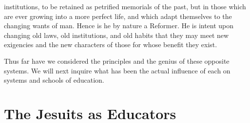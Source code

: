 \documentclass[]{book}
\begin{document}
institutions, to be retained as petrified memorials of the past, but in those which are ever growing into a more perfect life, and which adapt themselves to the changing wants of man. Hence is he by nature a Reformer. He is intent upon changing old laws, old institutions, and old habits that they may meet new exigencies and the new characters of those for whose benefit they exist.

Thus far have we considered the principles and the genius of these opposite systems. We will next inquire what has been the actual influence of each on systems and schools of education.

\hypertarget{the-jesuits-as-educators}{%
\chapter{The Jesuits as Educators}\label{the-jesuits-as-educators}}
\end{document}
